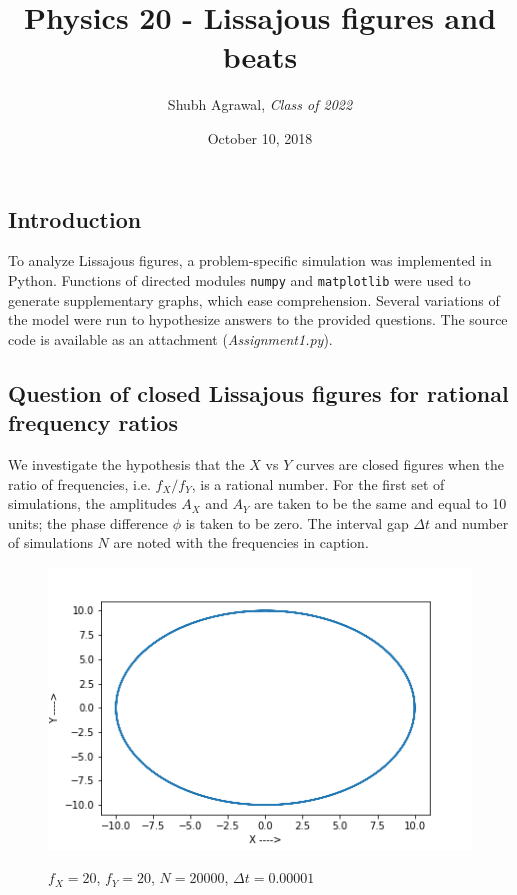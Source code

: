 \documentclass{report}
\title{\Large  Physics 20 - Lissajous figures and beats}
\author{\large Shubh Agrawal, \normalsize\emph{Class of 2022}}
\date{\small October 10, 2018}
\begin{document}
\maketitle
\subsection*{Introduction}
To analyze Lissajous figures, a problem-specific simulation was implemented in Python. Functions of directed modules \texttt{numpy} and \texttt{matplotlib} were used to generate supplementary graphs, which ease comprehension. Several variations of the model were run to hypothesize answers to the provided questions. The source code is available as an attachment (\emph{Assignment1.py}). 

\subsection*{Question of closed Lissajous figures for rational frequency ratios}
We investigate the hypothesis that the $X$ vs $Y$ curves are closed figures when the ratio of frequencies, i.e. $f_X/f_Y$, is a rational number. For the first set of simulations, the amplitudes $A_X$ and $A_Y$ are taken to be the same and equal to 10 units; the phase difference $\phi$ is taken to be zero. The interval gap $\Delta t$ and number of simulations $N$ are noted with the frequencies in caption.
\begin{figure}[H]
	\centering
	\includegraphics[width = \textwidth]{20-20.png}
	\label{closed1}
	\caption{$f_X=20$, $f_Y=20$, $N=20000$, $\Delta t=0.00001$}
\end{figure}
\end{document}
